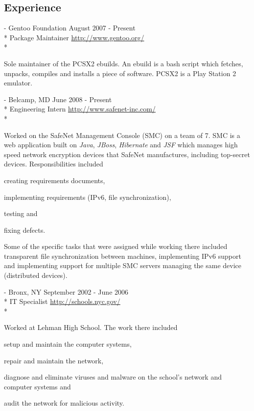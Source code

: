 \documentclass[a4paper,margin,line]{resume}
\newcommand{\rurl}[1]{\hfill {\footnotesize \url{#1}}}
\newcommand{\rdate}[1]{\hfill {\small #1}}
\renewcommand{\employer}[5]{\item[#1] - #2 \rdate{#3} \\* #4 \rurl{#5} \\*}
\begin{document}
\begin{resume}
\section{\mysidestyle Experience}
	\begin{asparadesc}
		\employer{Gentoo Linux}{Gentoo Foundation}{August 2007 - Present}{Package Maintainer}{http://www.gentoo.org/}

		\small
		Sole maintainer of the PCSX2 ebuilds. An ebuild is a bash script which fetches, unpacks, compiles and installs a piece of software. PCSX2 is a Play Station 2 emulator.
		\normalsize
		\\
		\employer{SafeNet Inc}{Belcamp, MD}{June 2008 - Present}{Engineering Intern}{http://www.safenet-inc.com/}

		\small
		Worked on the SafeNet Management Console (SMC) on a team of 7. SMC is a web application built on \emph{Java}, \emph{JBoss}, \emph{Hibernate} and \emph{JSF} which manages high speed network encryption devices that SafeNet manufactures, including top-secret devices. Responsibilities included \begin{inparaenum} \item creating requirements documents, \item implementing requirements (IPv6, file synchronization), \item testing and \item fixing defects. \end{inparaenum} Some of the specific tasks that were assigned while working there included transparent file synchronization between machines, implementing IPv6 support and implementing support for multiple SMC servers managing the same device (distributed devices).
		\normalsize
		\\
		\employer{New York City Department of Education}{Bronx, NY}{September 2002 - June 2006}{IT Specialist}{http://schools.nyc.gov/}

		\small
		Worked at Lehman High School. The work there included \begin{inparaenum} \item setup and maintain the computer systems, \item repair and maintain the network, \item diagnose and eliminate viruses and malware on the school's network and computer systems and \item audit the network for malicious activity. \end{inparaenum}
		\normalsize
%		
	\end{asparadesc}


\end{resume}
\end{document}
